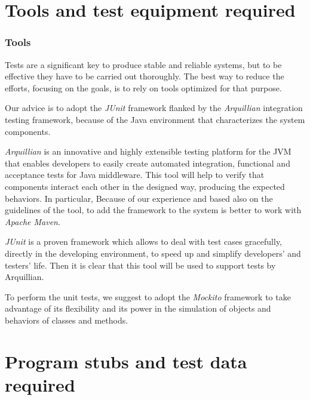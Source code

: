 \documentclass{scrreprt}
\begin{document}
\begin{comment}
\begin{center}
\begin{tabularx}{\columnwidth}{>{\bfseries}XX}
\toprule
\multicolumn{2}{>{\bfseries}c}{\textit{UserManager $\longrightarrow$ verifyAlreadyRegistered(name, surname, mail, cf)}}\\
\toprule

\bottomrule
\end{tabularx}
\end{center}
\end{comment}


\chapter{Tools and test equipment required}
\subsection{Tools}
Tests are a significant key to produce stable and reliable systems, but to be effective they have to be carried out thoroughly. The best way to reduce the efforts, focusing on the goals, is to rely on tools optimized for that purpose.

Our advice is to adopt the \emph{JUnit} framework flanked by the \emph{Arquillian} integration testing framework, because of the Java environment that characterizes the system components.

\emph{Arquillian} is an innovative and highly extensible testing platform for the JVM that enables developers to easily create automated integration, functional and acceptance tests for Java middleware. This tool will help to verify that components interact each other in the designed way, producing the expected behaviors.
In particular, 
Because of our experience and based also on the guidelines of the tool, to add the framework to the system is better to work with \emph{Apache Maven}.

\emph{JUnit} is a proven framework which allows to deal with test cases gracefully, directly in the developing environment, to speed up and simplify developers' and testers' life. Then it is clear that this tool will be used to support tests by Arquillian.

To perform the unit tests, we suggest to adopt the \emph{Mockito} framework to take advantage of its flexibility and its power in the simulation of objects and behaviors of classes and methods.

\chapter{Program stubs and test data required}
\end{document}
